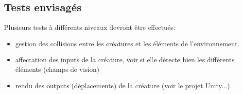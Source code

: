 \subsection{Tests envisagés}
Plusieurs tests à différents niveaux devront être effectués:
\begin{itemize}
  \item gestion des collisions entre les créatures et les éléments de l'environnement.\\

 \item affectation des inputs de la créature, voir si elle détecte bien les différents éléments (champs de vision)\\
 \item rendu des outputs (déplacements) de la créature
(voir le projet Unity...)
\end{itemize}
\clearpage

